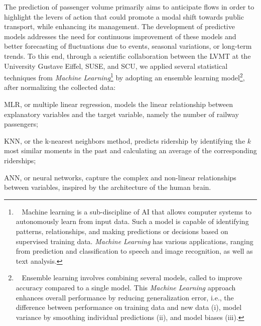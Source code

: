 \begin{refsegment}
The prediction of passenger volume primarily aims to anticipate flows in order to highlight the levers of action that could promote a modal shift towards public transport, while enhancing its management. The development of predictive models addresses the need for continuous improvement of these models and better forecasting of fluctuations due to events, seasonal variations, or long-term trends. To this end, through a scientific collaboration between the \acrfull{LVMT} at the University Gustave Eiffel, \acrfull{SUSE}, and \acrfull{SCU}, we applied several statistical techniques from \textsl{Machine Learning}\footnote{~
    Machine learning is a sub-discipline of \acrfull{AI} that allows computer systems to autonomously learn from input data. Such a model is capable of identifying patterns, relationships, and making predictions or decisions based on supervised training data. \textsl{Machine Learning} has various applications, ranging from prediction and classification to speech and image recognition, as well as text analysis.
} by adopting an ensemble learning model\footnote{~
    Ensemble learning involves combining several models, called  to improve accuracy compared to a single model. This \textsl{Machine Learning} approach enhances overall performance by reducing generalization error, i.e., the difference between performance on training data and new data (i), model variance by smoothing individual predictions (ii), and model biases (iii).
}, after normalizing the collected data:
\begin{customitemize}
    \item \acrfull{MLR}, or multiple linear regression, models the linear relationship between explanatory variables and the target variable, namely the number of railway passengers;
    \item \acrfull{KNN}, or the k-nearest neighbors method, predicts ridership by identifying the \(k\) most similar moments in the past and calculating an average of the corresponding riderships;
    \item \acrfull{ANN}, or neural networks, capture the complex and non-linear relationships between variables, inspired by the architecture of the human brain.
\end{customitemize}


\end{refsegment}
